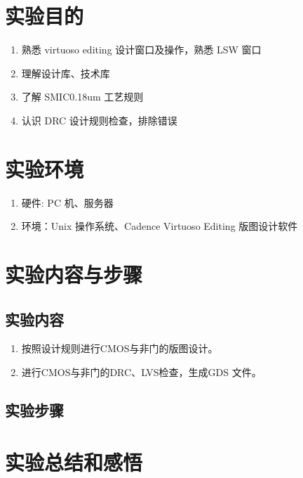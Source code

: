 \documentclass{course-thesis/theme-2614084}
\begin{document}

\makecover


\section{实验目的}

\begin{enumerate}
  \item 熟悉 virtuoso editing 设计窗口及操作，熟悉 LSW 窗口
  \item 理解设计库、技术库
  \item 了解 SMIC0.18um 工艺规则
  \item 认识 DRC 设计规则检查，排除错误
\end{enumerate}

\section{实验环境}

\begin{enumerate}
  \item 硬件: PC 机、服务器
  \item 环境：Unix 操作系统、Cadence Virtuoso Editing 版图设计软件
\end{enumerate}

\section{实验内容与步骤}


\subsection{实验内容}

\begin{enumerate}
  \item 按照设计规则进行CMOS与非门的版图设计。
  \item 进行CMOS与非门的DRC、LVS检查，生成GDS 文件。
\end{enumerate}

\subsection{实验步骤}

\section{实验总结和感悟}
\end{document}
